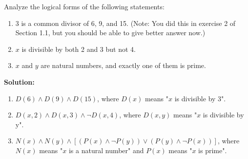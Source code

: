 Analyze the logical forms of the following statements:
\begin{enumerate}[label=(\alph*)]
    \item 3 is a common divisor of 6, 9, and 15. (Note: You did this in exercise 2 of Section 1.1, but you should be able to give better answer now.)
    \item $x$ is divisible by both 2 and 3 but not 4.
    \item $x$ and $y$ are natural numbers, and exactly one of them is prime.
\end{enumerate}

\textbf{Solution:}
\begin{enumerate}[label=(\alph*)]
\item $D(6) \wedge D(9) \wedge D(15)$, where $D(x)$ means "$x$ is divisible by 3".
\item $D(x,2) \wedge D(x,3) \wedge \neg D(x,4)$, where $D(x,y)$ means "$x$ is divisible by y". 
\item $N(x) \wedge N(y) \wedge [(P(x) \wedge \neg P(y)) \vee (P(y) \wedge \neg P(x))]$, where $N(x)$ means "$x$ is a natural number" and $P(x)$ means "$x$ is prime".
\end{enumerate}

\pagebreak